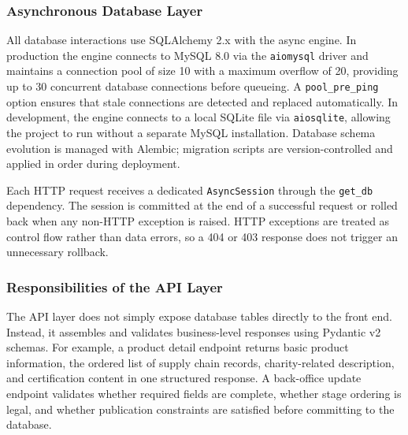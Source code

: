 \documentclass[11pt]{article}
\begin{document}
\subsubsection{Asynchronous Database Layer}
All database interactions use SQLAlchemy 2.x with the async engine. In production the engine connects to MySQL 8.0 via the \texttt{aiomysql} driver and maintains a connection pool of size 10 with a maximum overflow of 20, providing up to 30 concurrent database connections before queueing. A \texttt{pool\_pre\_ping} option ensures that stale connections are detected and replaced automatically. In development, the engine connects to a local SQLite file via \texttt{aiosqlite}, allowing the project to run without a separate MySQL installation. Database schema evolution is managed with Alembic; migration scripts are version-controlled and applied in order during deployment.

Each HTTP request receives a dedicated \texttt{AsyncSession} through the \texttt{get\_db} dependency. The session is committed at the end of a successful request or rolled back when any non-HTTP exception is raised. HTTP exceptions are treated as control flow rather than data errors, so a 404 or 403 response does not trigger an unnecessary rollback.

\subsubsection{Responsibilities of the API Layer}
The API layer does not simply expose database tables directly to the front end. Instead, it assembles and validates business-level responses using Pydantic v2 schemas. For example, a product detail endpoint returns basic product information, the ordered list of supply chain records, charity-related description, and certification content in one structured response. A back-office update endpoint validates whether required fields are complete, whether stage ordering is legal, and whether publication constraints are satisfied before committing to the database.
\end{document}

